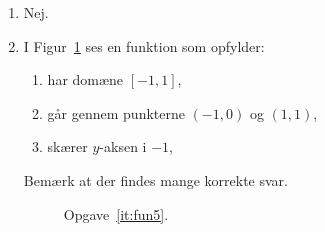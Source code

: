 \begin{enumerate}
		\item Nej.
	
	\item \label{it:fun5} I Figur~\ref{fig:fun5} ses en funktion som opfylder:
	\begin{enumerate}
		\item har domæne $[-1,1]$,
		\item går gennem punkterne $(-1,0)$ og $(1,1)$,
		\item skærer $y$-aksen i $-1$,
	\end{enumerate}
	Bemærk at der findes mange korrekte svar.
	
	\begin{figure}
		\centering
		\caption{Opgave~\ref{it:fun5}.}
		\label{fig:fun5}
	\end{figure}
\end{enumerate}